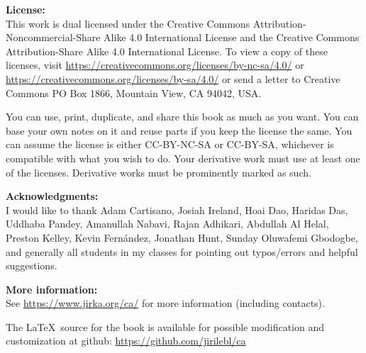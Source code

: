 \documentclass[12pt,openany]{book}
\newcommand{\ignore}[1]{}
\theoremstyle{plain}
\theoremstyle{remark}
\theoremstyle{definition}
\theoremstyle{exercise}
\theoremstyle{example}
\begin{document}
\bigskip

\noindent
\textbf{License:}
\\
This work is dual licensed under
the Creative Commons
Attribution-Non\-commercial-Share Alike 4.0 International License and
the Creative Commons
Attribution-Share Alike 4.0 International License.
To view a
copy of these licenses, visit
\url{https://creativecommons.org/licenses/by-nc-sa/4.0/}
or
\url{https://creativecommons.org/licenses/by-sa/4.0/}
or send a letter to
Creative Commons
PO Box 1866, Mountain View, CA 94042, USA\@.

\bigskip

\noindent
You can use, print, duplicate, and share this book as much as you want.  You can
base your own notes on it and reuse parts if you keep the license the
same.  You can assume the license is either CC-BY-NC-SA or CC-BY-SA\@,
whichever is compatible with what you wish to do.
Your derivative work must use at least one of the licenses.
Derivative works must be prominently marked as such.


\bigskip

\noindent
\textbf{Acknowledgments:}
\\
I would like to thank 
Adam Cartisano,
Josiah Ireland,
Hoai Dao,
Haridas Das,
Uddhaba Pandey,
Amanullah Nabavi,
Rajan Adhikari,
Abdullah Al Helal,
Preston Kelley,
Kevin Fern\'andez,
Jonathan Hunt,
Sunday Oluwafemi Gbodogbe,
and generally all students in my classes
for pointing out typos/errors
and helpful suggestions. 
%
%

\bigskip

\noindent
\textbf{More information:}
\\
See \url{https://www.jirka.org/ca/} for more information
(including contacts).


\medskip

\noindent
The \LaTeX\ source for the book is available
for possible modification and customization
at github: \url{https://github.com/jirilebl/ca}



\tableofcontents
{}
\end{document}
